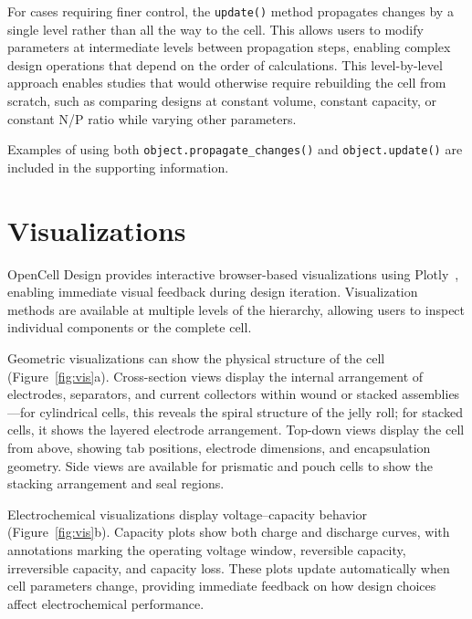 \documentclass[12pt]{article}
\begin{document}
For cases requiring finer control, the \texttt{update()} method propagates changes by a single level rather than all the way to the cell. This allows users to modify parameters at intermediate levels between propagation steps, enabling complex design operations that depend on the order of calculations. This level-by-level approach enables studies that would otherwise require rebuilding the cell from scratch, such as comparing designs at constant volume, constant capacity, or constant N/P ratio while varying other parameters.

Examples of using both \texttt{object.propagate\_changes()} and \texttt{object.update()} are included in the supporting information.

\section{Visualizations}

OpenCell Design provides interactive browser-based visualizations using Plotly~\cite{plotly2015}, enabling immediate visual feedback during design iteration. Visualization methods are available at multiple levels of the hierarchy, allowing users to inspect individual components or the complete cell.

Geometric visualizations can show the physical structure of the cell (Figure~\ref{fig:vis}a). Cross-section views display the internal arrangement of electrodes, separators, and current collectors within wound or stacked assemblies---for cylindrical cells, this reveals the spiral structure of the jelly roll; for stacked cells, it shows the layered electrode arrangement. Top-down views display the cell from above, showing tab positions, electrode dimensions, and encapsulation geometry. Side views are available for prismatic and pouch cells to show the stacking arrangement and seal regions.

Electrochemical visualizations display voltage--capacity behavior (Figure~\ref{fig:vis}b). Capacity plots show both charge and discharge curves, with annotations marking the operating voltage window, reversible capacity, irreversible capacity, and capacity loss. These plots update automatically when cell parameters change, providing immediate feedback on how design choices affect electrochemical performance.
\end{document}
